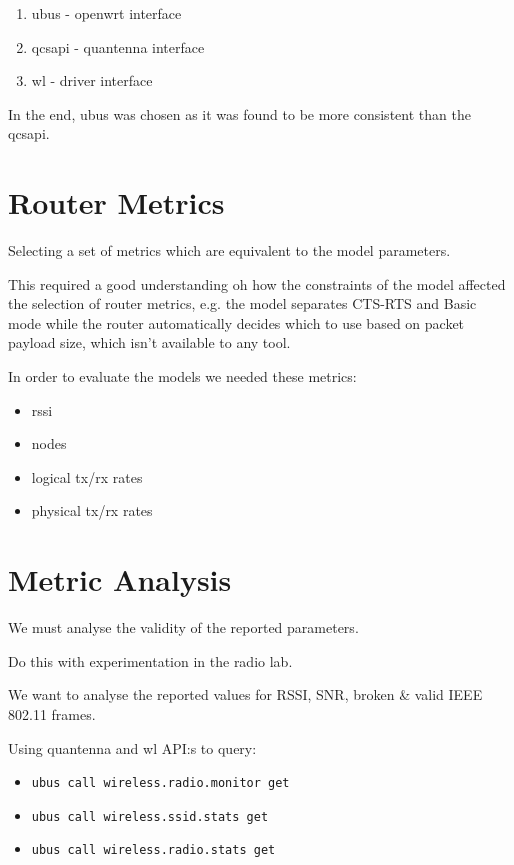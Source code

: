 \begin{enumerate}
	\item ubus - openwrt interface
	\item qcsapi - quantenna interface
	\item wl - driver interface
\end{enumerate}

In the end, ubus was chosen as it was found to be more consistent than the qcsapi.

\section{Router Metrics}
Selecting a set of metrics which are equivalent to the model parameters.

This required a good understanding oh how the constraints of the model affected the selection of router metrics, e.g. the model separates CTS-RTS and Basic mode while the router automatically decides which to use based on packet payload size, which isn't available to any tool.

In order to evaluate the models we needed these metrics:

\begin{itemize}
\item rssi
\item nodes
\item logical tx/rx rates
\item physical tx/rx rates
\end{itemize}

\section{Metric Analysis}

We must analyse the validity of the reported parameters.

Do this with experimentation in the radio lab.

We want to analyse the reported values for RSSI, SNR, broken \& valid IEEE 802.11 frames.

Using quantenna and wl API:s to query:
\begin{itemize}
    \item \texttt{ubus call wireless.radio.monitor get}
    \item \texttt{ubus call wireless.ssid.stats get}
    \item \texttt{ubus call wireless.radio.stats get}
\end{itemize}
